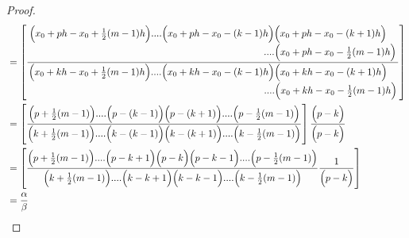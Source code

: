 \documentclass[../document.tex]{subfiles}
\begin{document}
\begin{appendices}
\begin{proof}
			\begin{equation}        \label{alpha_beta}
				\begin{split}
					&=\left[ \frac{
						\splitfrac{
							\Big(
							x_0 +ph -x_0 + \frac{1}{2}(m-1)h
							\Big)
							....
							\Big(
							x_0 +ph -x_0 - (k-1)h
							\Big)
							\Big(
							x_0 +ph -x_0 - (k+1)h
							\Big)
						}{
							....
							\Big(
							x_0 +ph -x_0 - \frac{1}{2}(m-1)h
							\Big)
						}
					}{
						\splitfrac{
							\Big(
							x_0 +kh -x_0 + \frac{1}{2}(m-1)h
							\Big)
							....
							\Big(
							x_0 +kh -x_0 - (k-1)h
							\Big)
							\Big(
							x_0 +kh -x_0 - (k+1)h
							\Big)
						}{
							....
							\Big(
							x_0 +kh -x_0 - \frac{1}{2}(m-1)h
							\Big)
						}
					}
					\right]
					\\
					&=\left[ \frac{
						\Big(
						p + \frac{1}{2}(m-1)
						\Big)
						....
						\Big(
						p - (k-1)
						\Big)
						\Big(
						p  - (k+1)
						\Big)
						....
						\Big(
						p  - \frac{1}{2}(m-1)
						\Big)
					}{
						\Big(
						k + \frac{1}{2}(m-1)
						\Big)
						....
						\Big(
						k - (k-1)
						\Big)
						\Big(
						k  - (k+1)
						\Big)
						....
						\Big(
						k  - \frac{1}{2}(m-1)
						\Big)
					}
					\right] \frac{\Big(p-k\Big)}{\Big(p-k\Big)}
					\\
					&=\left[ \frac{
						\Big(
						p + \frac{1}{2}(m-1)
						\Big)
						....
						\Big(
						p - k+1
						\Big)
						\Big(p-k\Big)
						\Big(
						p  - k-1
						\Big)
						....
						\Big(
						p  - \frac{1}{2}(m-1)
						\Big)
					}{
						\Big(
						k + \frac{1}{2}(m-1)
						\Big)
						....
						\Big(
						k - k + 1
						\Big)
						\Big(
						k  - k -1
						\Big)
						....
						\Big(
						k  - \frac{1}{2}(m-1)
						\Big)
					}
					\frac{1}{  \Big(p-k\Big)}
					\right] 
					\\
					&=\frac{ \alpha }{ \beta }
				\end{split}
			\end{equation}
			

\end{proof}
\end{appendices}
\end{document}

